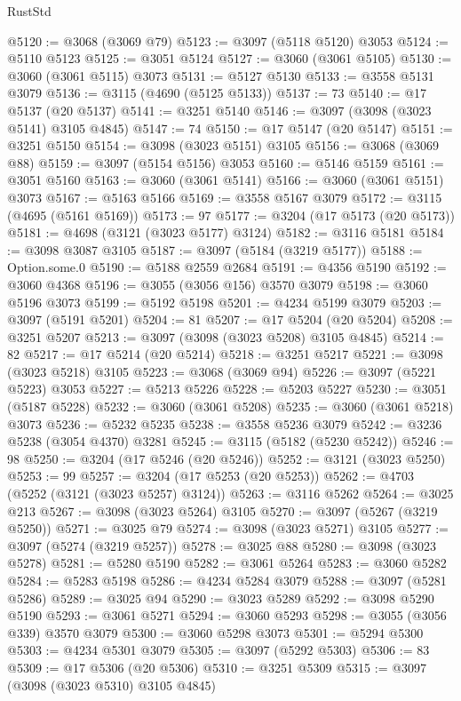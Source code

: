 \begin{lexlean}{RustStd}
\begin{coremodule}
@5120 := @3068 (@3069 @79)
@5123 := @3097 (@5118 @5120) @3053
@5124 := @5110 @5123
@5125 := @3051 @5124
@5127 := @3060 (@3061 @5105)
@5130 := @3060 (@3061 @5115) @3073
@5131 := @5127 @5130
@5133 := @3558 @5131 @3079
@5136 := @3115 (@4690 (@5125 @5133))
@5137 := 73
@5140 := @17 @5137 (@20 @5137)
@5141 := @3251 @5140
@5146 := @3097 (@3098 (@3023 @5141) @3105 @4845)
@5147 := 74
@5150 := @17 @5147 (@20 @5147)
@5151 := @3251 @5150
@5154 := @3098 (@3023 @5151) @3105
@5156 := @3068 (@3069 @88)
@5159 := @3097 (@5154 @5156) @3053
@5160 := @5146 @5159
@5161 := @3051 @5160
@5163 := @3060 (@3061 @5141)
@5166 := @3060 (@3061 @5151) @3073
@5167 := @5163 @5166
@5169 := @3558 @5167 @3079
@5172 := @3115 (@4695 (@5161 @5169))
@5173 := 97
@5177 := @3204 (@17 @5173 (@20 @5173))
@5181 := @4698 (@3121 (@3023 @5177) @3124)
@5182 := @3116 @5181
@5184 := @3098 @3087 @3105
@5187 := @3097 (@5184 (@3219 @5177))
@5188 := Option.some.{0}
@5190 := @5188 @2559 @2684
@5191 := @4356 @5190
@5192 := @3060 @4368
@5196 := @3055 (@3056 @156) @3570 @3079
@5198 := @3060 @5196 @3073
@5199 := @5192 @5198
@5201 := @4234 @5199 @3079
@5203 := @3097 (@5191 @5201)
@5204 := 81
@5207 := @17 @5204 (@20 @5204)
@5208 := @3251 @5207
@5213 := @3097 (@3098 (@3023 @5208) @3105 @4845)
@5214 := 82
@5217 := @17 @5214 (@20 @5214)
@5218 := @3251 @5217
@5221 := @3098 (@3023 @5218) @3105
@5223 := @3068 (@3069 @94)
@5226 := @3097 (@5221 @5223) @3053
@5227 := @5213 @5226
@5228 := @5203 @5227
@5230 := @3051 (@5187 @5228)
@5232 := @3060 (@3061 @5208)
@5235 := @3060 (@3061 @5218) @3073
@5236 := @5232 @5235
@5238 := @3558 @5236 @3079
@5242 := @3236 @5238 (@3054 @4370) @3281
@5245 := @3115 (@5182 (@5230 @5242))
@5246 := 98
@5250 := @3204 (@17 @5246 (@20 @5246))
@5252 := @3121 (@3023 @5250)
@5253 := 99
@5257 := @3204 (@17 @5253 (@20 @5253))
@5262 := @4703 (@5252 (@3121 (@3023 @5257) @3124))
@5263 := @3116 @5262
@5264 := @3025 @213
@5267 := @3098 (@3023 @5264) @3105
@5270 := @3097 (@5267 (@3219 @5250))
@5271 := @3025 @79
@5274 := @3098 (@3023 @5271) @3105
@5277 := @3097 (@5274 (@3219 @5257))
@5278 := @3025 @88
@5280 := @3098 (@3023 @5278)
@5281 := @5280 @5190
@5282 := @3061 @5264
@5283 := @3060 @5282
@5284 := @5283 @5198
@5286 := @4234 @5284 @3079
@5288 := @3097 (@5281 @5286)
@5289 := @3025 @94
@5290 := @3023 @5289
@5292 := @3098 @5290 @5190
@5293 := @3061 @5271
@5294 := @3060 @5293
@5298 := @3055 (@3056 @339) @3570 @3079
@5300 := @3060 @5298 @3073
@5301 := @5294 @5300
@5303 := @4234 @5301 @3079
@5305 := @3097 (@5292 @5303)
@5306 := 83
@5309 := @17 @5306 (@20 @5306)
@5310 := @3251 @5309
@5315 := @3097 (@3098 (@3023 @5310) @3105 @4845)

\end{coremodule}
\end{lexlean}
